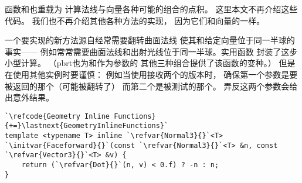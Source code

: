 函数和也重载为
计算法线与向量各种可能的组合的点积。
这里本文不再介绍这些代码。
我们也不再介绍其他各种方法的实现，
因为它们和向量的一样。

一个要实现的新方法源自经常需要翻转曲面法线
使其和给定向量位于同一半球的事实——
例如常常需要曲面法线和出射光线位于同一半球。实用函数
封装了这步小型计算。
（pbrt也为和作为参数的
其他三种组合提供了该函数的变种。）
但是在使用其他实例时要谨慎：
例如当使用接收两个的版本时，
确保第一个参数是要被返回的那个（可能被翻转了）
而第二个是被测试的那个。
弄反这两个参数会给出意外结果。
\begin{lstlisting}
`\refcode{Geometry Inline Functions}{+=}\lastnext{GeometryInlineFunctions}`
template <typename T> inline `\refvar{Normal3}{}`<T>
`\initvar{Faceforward}{}`(const `\refvar{Normal3}{}`<T> &n, const `\refvar{Vector3}{}`<T> &v) {
    return (`\refvar{Dot}{}`(n, v) < 0.f) ? -n : n;
}
\end{lstlisting}